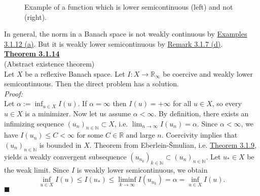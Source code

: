 \begin{figure}[ht]
	\centering
	\caption{Example of a function which is lower semicontinuous (left) and not (right).}
\end{figure}

In general, the norm in a Banach space is not weakly continuous by \hyperlink{examples_3_1_12}{Examples 3.1.12 (a)}. But it is weakly lower semicontinuous by \hyperlink{remark_3_1_7}{Remark 3.1.7 (d)}.\\

\hypertarget{theorem_3_1_14}{\textbf{\underline{Theorem 3.1.14}}}\\
(Abstract existence theorem)\\
Let $X$ be a reflexive Banach space. Let $I:X\longrightarrow\mathbb{R}_\infty$ be coercive and weakly lower semicontinuous. Then the direct problem has a solution.\\

\textit{Proof:}\\
Let $\alpha:=\inf_{u\in X}{I(u)}$. If $\alpha=\infty$ then $I(u)=+\infty$ for all $u\in X$, so every $u\in X$ is a minimizer. Now let us assume $\alpha<\infty$. By definition, there exists an infimizing sequence $(u_n)_{n\in\mathbb{N}}\subset X$, i.e. $\lim_{n\to\infty}{I(u_n)}=\alpha$. Since $\alpha<\infty$, we have $I(u_n)\leq C<\infty$ for some $C\in\mathbb{R}$ and large $n$. Coercivity implies that $(u_n)_{n\in\mathbb{N}}$ is bounded in $X$. Theorem from Eberlein-\v{S}mulian, i.e. \hyperlink{theorem_3_1_9}{Theorem 3.1.9}, yields a weakly convergent subsequence $(u_{n_k})_{k\in\mathbb{N}}\subset(u_n)_{n\in\mathbb{N}}$. Let $u_*\in X$ be the weak limit. Since $I$ is weakly lower semicontinuous, we obtain
\[\inf_{u\in X}{I(u)}\leq I(u_*)\leq\liminf_{k\to\infty}{I(u_{n_k})}=\alpha=\inf_{u\in X}{I(u)}.\]
\hfill$\blacksquare$\\[11pt]

